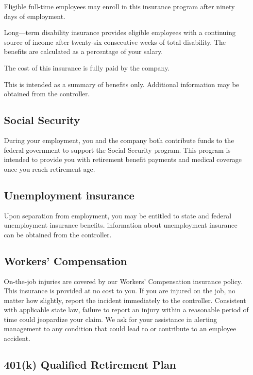 Eligible full-time employees may enroll in this insurance program after ninety days of employment.

Long—term disability insurance provides eligible employees with a continuing source of income after twenty-six consecutive weeks of total disability. The benefits are calculated as a percentage of your salary.

The cost of this insurance is fully paid by the company.

This is intended as a summary of benefits only. Additional information may be obtained from the controller.

\subsection{Social Security}

During your employment, you and the company both contribute funds to the federal government to support the Social Security program. This program is intended to provide you with retirement benefit payments and medical coverage once you reach retirement age.

\subsection{Unemployment insurance}

Upon separation from employment, you may be entitled to state and federal unemployment insurance benefits. information about unemployment insurance can be obtained from the controller.

\subsection{Workers' Compensation}

On-the-job injuries are covered by our Workers’ Compensation insurance policy. This insurance is provided at no cost to you. If you are injured on the job, no matter how slightly, report the incident immediately to the controller. Consistent with applicable state law, failure to report an injury within a reasonable period of time could jeopardize your claim. We ask for your assistance in alerting management to any condition that could lead to or contribute to an employee accident.

\subsection{401(k) Qualified Retirement Plan}

